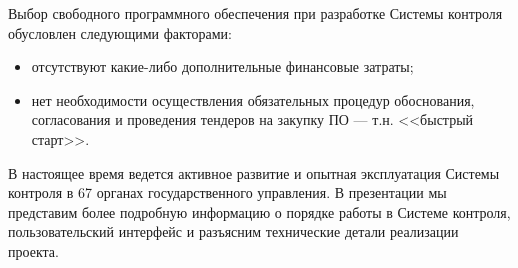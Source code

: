\documentclass[10pt, a5paper]{article}
\begin{document}
Выбор свободного программного обеспечения при разработке Системы контроля обусловлен следующими факторами:

\begin{itemize}
  \item отсутствуют какие-либо дополнительные финансовые затраты;
  \item нет необходимости осуществления обязательных процедур обоснования, согласования и проведения тендеров на закупку ПО --- т.н. <<быстрый старт>>.
\end{itemize}

В настоящее время ведется активное развитие и опытная эксплуатация Системы контроля в 67 органах государственного управления. В презентации мы представим более подробную информацию о порядке работы в Системе контроля, пользовательский интерфейс и разъясним технические детали реализации проекта.
\end{document}
